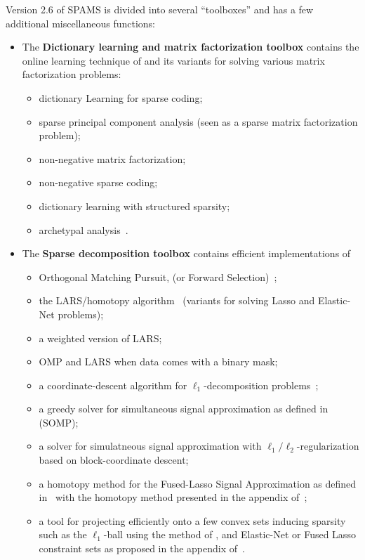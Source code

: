 \documentclass[a4paper, 11pt]{article}
\begin{document}
Version 2.6 of SPAMS is divided into several ``toolboxes'' and has a few
additional miscellaneous functions:
\begin{itemize}
\item The \textbf{Dictionary learning and matrix factorization toolbox}
contains the online learning technique of \cite{mairal7,mairal9} and its
variants for solving various matrix factorization problems:
\begin{itemize}
\item dictionary Learning for sparse coding;
\item sparse principal component analysis (seen as a sparse matrix factorization problem);
\item non-negative matrix factorization;
\item non-negative sparse coding;
\item dictionary learning with structured sparsity;
\item archetypal analysis~\cite{Cut94,ChenCVPR}.
\end{itemize}
\item The \textbf{Sparse decomposition toolbox} contains efficient implementations of
\begin{itemize}
\item Orthogonal Matching Pursuit, (or Forward Selection)~\cite{weisberg,mallat4};
\item the LARS/homotopy algorithm~\cite{osborne,efron} (variants for solving Lasso and Elastic-Net problems);
\item a weighted version of LARS;
\item OMP and LARS when data comes with a binary mask;
\item a coordinate-descent algorithm for $\ell_1$-decomposition problems~\cite{fu,friedman,wu};
\item a greedy solver for simultaneous signal approximation as defined in~\cite{tropp2,tropp3} (SOMP);
\item a solver for simulatneous signal approximation with $\ell_1/\ell_2$-regularization based on block-coordinate descent;
\item a homotopy method for the Fused-Lasso Signal Approximation as defined in~\cite{friedman} with the homotopy method presented in the appendix of~\cite{mairal9};
\item a tool for projecting efficiently onto a few convex sets
inducing sparsity such as the $\ell_1$-ball using the method of
\cite{brucker,maculan,duchi}, and Elastic-Net or Fused Lasso constraint sets as
proposed in the appendix of~\cite{mairal9}.

\end{itemize}
\end{itemize}
\end{document}
